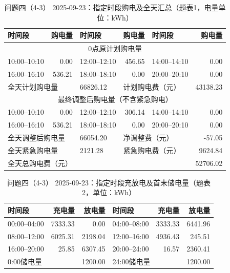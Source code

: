 \FloatBarrier
\begin{table}[H]
\centering\footnotesize
\setlength{\tabcolsep}{4pt}
\caption{问题四（4-3） 2025-09-23：指定时段购电及全天汇总（题表1，电量单位：kWh）}
\label{tab:required-q43-2025-09-23-grid}
\begin{tabular}{@{}lrlrlr@{}}
\toprule
时间段 & 购电量 & 时间段 & 购电量 & 时间段 & 购电量 \\
\midrule
\multicolumn{6}{c}{0点原计划购电量} \\
10:00--10:10 & 0.00 & 12:00--12:10 & 456.65 & 14:00--14:10 & 0.00 \\
16:00--16:10 & 536.21 & 18:00--18:10 & 0.00 & 20:00--20:10 & 0.00 \\
\multicolumn{2}{l}{全天计划购电量} & 66826.12 & \multicolumn{2}{l}{计划购电费（元）} & 43138.23 \\
\multicolumn{6}{c}{最终调整后购电量（不含紧急购电）} \\
10:00--10:10 & 0.00 & 12:00--12:10 & 306.14 & 14:00--14:10 & 0.00 \\
16:00--16:10 & 536.21 & 18:00--18:10 & 0.00 & 20:00--20:10 & 0.00 \\
\multicolumn{2}{l}{全天调整后购电量} & 66054.20 & \multicolumn{2}{l}{净调整费（元）} & -57.05 \\
\multicolumn{2}{l}{全天紧急购电量} & 2121.28 & \multicolumn{2}{l}{紧急购电费（元）} & 9624.84 \\
\multicolumn{5}{l}{全天总购电费（元）} & 52706.02 \\
\bottomrule
\end{tabular}
\end{table}

\begin{table}[H]
\centering\footnotesize
\setlength{\tabcolsep}{4pt}
\caption{问题四（4-3） 2025-09-23：指定时段充放电及首末储电量（题表2，单位：kWh）}
\label{tab:required-q43-2025-09-23-storage}
\begin{tabular}{@{}lrrlrr@{}}
\toprule
时间段 & 充电量 & 放电量 & 时间段 & 充电量 & 放电量 \\
\midrule
00:00--04:00 & 7333.33 & 0.00 & 04:00--08:00 & 3333.33 & 6441.96 \\
08:00--12:00 & 6025.31 & 2198.04 & 12:00--16:00 & 4936.43 & 245.51 \\
16:00--20:00 & 25.85 & 6307.45 & 20:00--24:00 & 16.57 & 2360.41 \\
\multicolumn{2}{l}{0:00储电量} & 1200.00 & \multicolumn{2}{l}{24:00储电量} & 1200.00 \\
\bottomrule
\end{tabular}
\end{table}

